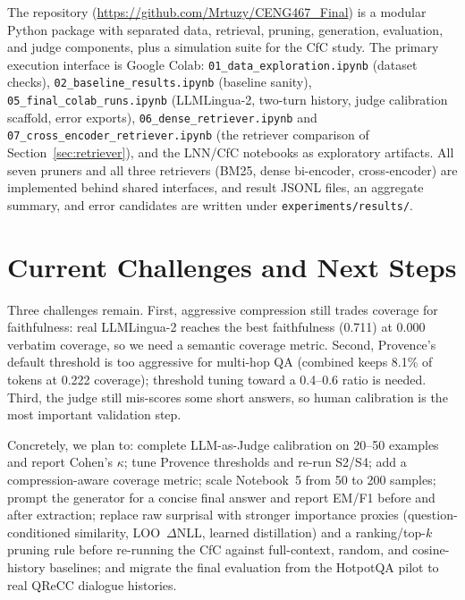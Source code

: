 \documentclass[runningheads]{llncs}
\begin{document}
The repository (\url{https://github.com/Mrtuzy/CENG467_Final}) is a modular
Python package with separated data, retrieval, pruning, generation, evaluation,
and judge components, plus a simulation suite for the CfC study. The primary
execution interface is Google Colab:
\texttt{01\_data\_exploration.ipynb} (dataset checks),
\texttt{02\_baseline\_results.ipynb} (baseline sanity),
\texttt{05\_final\_colab\_runs.ipynb} (LLMLingua-2, two-turn history, judge
calibration scaffold, error exports),
\texttt{06\_dense\_retriever.ipynb} and \texttt{07\_cross\_encoder\_retriever.ipynb}
(the retriever comparison of Section~\ref{sec:retriever}), and the LNN/CfC
notebooks as exploratory artifacts. All seven pruners and all three retrievers
(BM25, dense bi-encoder, cross-encoder) are implemented behind shared
interfaces, and result JSONL files, an aggregate summary, and error candidates
are written under \texttt{experiments/results/}.

\section{Current Challenges and Next Steps}

Three challenges remain. First, aggressive compression still trades coverage for
faithfulness: real LLMLingua-2 reaches the best faithfulness (0.711) at 0.000
verbatim coverage, so we need a semantic coverage metric. Second, Provence's
default threshold is too aggressive for multi-hop QA (combined keeps 8.1\% of
tokens at 0.222 coverage); threshold tuning toward a 0.4--0.6 ratio is needed.
Third, the judge still mis-scores some short answers, so human calibration is
the most important validation step.

Concretely, we plan to: complete LLM-as-Judge calibration on 20--50 examples and
report Cohen's $\kappa$; tune Provence thresholds and re-run S2/S4; add a
compression-aware coverage metric; scale Notebook~5 from 50 to 200 samples;
prompt the generator for a concise final answer and report EM/F1 before and
after extraction; replace raw surprisal with stronger importance proxies
(question-conditioned similarity, LOO~$\Delta$NLL, learned distillation) and a
ranking/top-$k$ pruning rule before re-running the CfC against full-context,
random, and cosine-history baselines; and migrate the final evaluation from the
HotpotQA pilot to real QReCC dialogue histories.
\end{document}
